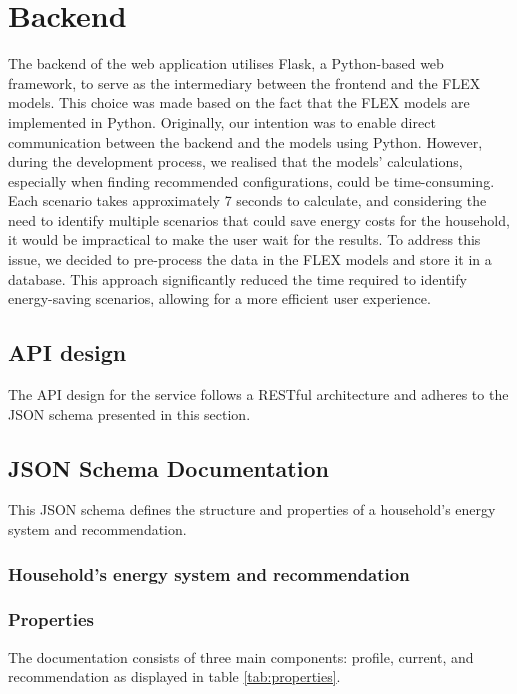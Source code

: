 \section{Backend}

The backend of the web application utilises Flask, a Python-based web framework, to serve as the intermediary between the frontend and the FLEX models. 
This choice was made based on the fact that the FLEX models are implemented in Python. 
Originally, our intention was to enable direct communication between the backend and the models using Python. 
However, during the development process, we realised that the models' calculations, especially when finding recommended configurations, could be time-consuming. 
Each scenario takes approximately 7 seconds to calculate, and considering the need to identify multiple scenarios that could save energy costs for the household, 
it would be impractical to make the user wait for the results. 
To address this issue, we decided to pre-process the data in the FLEX models and store it in a database. 
This approach significantly reduced the time required to identify energy-saving scenarios, allowing for a more efficient user experience.


\subsection{API design}

The API design for the service follows a RESTful architecture and adheres to the JSON schema presented in this section. 


\subsection{JSON Schema Documentation}

This JSON schema defines the structure and properties of a household's energy system and recommendation.


\subsubsection{Household's energy system and recommendation}


\subsubsection{Properties}

The documentation consists of three main components: profile, current, and recommendation as displayed in table \ref{tab:properties}. 

